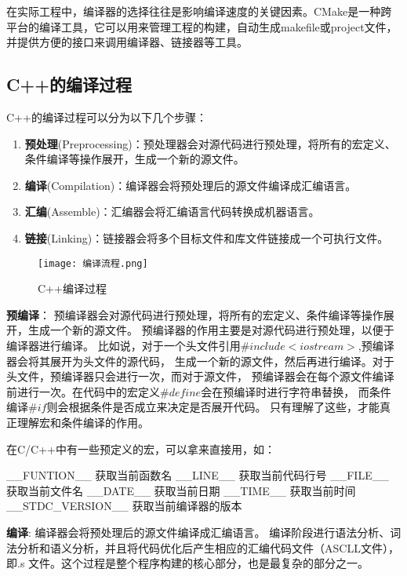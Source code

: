 在实际工程中，编译器的选择往往是影响编译速度的关键因素。CMake是一种跨平台的编译工具，它可以用来管理工程的构建，自动生成makefile或project文件，并提供方便的接口来调用编译器、链接器等工具。

\subsection{C++的编译过程}

C++的编译过程可以分为以下几个步骤：

\begin{enumerate}
    \item \textbf{预处理}(Preprocessing)：预处理器会对源代码进行预处理，将所有的宏定义、条件编译等操作展开，生成一个新的源文件。
    \item \textbf{编译}(Compilation)：编译器会将预处理后的源文件编译成汇编语言。
    \item \textbf{汇编}(Assemble)：汇编器会将汇编语言代码转换成机器语言。
    \item \textbf{链接}(Linking)：链接器会将多个目标文件和库文件链接成一个可执行文件。
\end{enumerate}

\begin{figure}[H]
    \centering
    \texttt{[image: 编译流程.png]}
    \caption{C++编译过程} %
    \label{fig:编译} %
\end{figure}

\textbf{预编译}：
预编译器会对源代码进行预处理，将所有的宏定义、条件编译等操作展开，生成一个新的源文件。
预编译器的作用主要是对源代码进行预处理，以便于编译器进行编译。
比如说，对于一个头文件引用$\#include<iostream>$,预编译器会将其展开为头文件的源代码，
生成一个新的源文件，然后再进行编译。对于头文件，预编译器只会进行一次，而对于源文件，
预编译器会在每个源文件编译前进行一次。在代码中的宏定义$\#define$会在预编译时进行字符串替换，
而条件编译$\#if$则会根据条件是否成立来决定是否展开代码。
只有理解了这些，才能真正理解宏和条件编译的作用。

在C/C++中有一些预定义的宏，可以拿来直接用，如：
\begin{tcode}
__FUNTION__  获取当前函数名 
__LINE__ 获取当前代码行号 
__FILE__ 获取当前文件名 
__DATE__ 获取当前日期 
__TIME__ 获取当前时间
__STDC_VERSION__  获取当前编译器的版本
\end{tcode}

\textbf{编译}:
编译器会将预处理后的源文件编译成汇编语言。
编译阶段进行语法分析、词法分析和语义分析，并且将代码优化后产生相应的汇编代码文件（ASCLL文件），
即.s 文件。这个过程是整个程序构建的核心部分，也是最复杂的部分之一。

